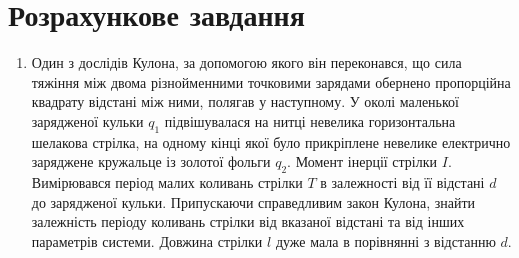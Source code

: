 \section*{Розрахункове завдання}

\begin{enumerate}
\item Один з дослідів Кулона, за допомогою якого він переконався, що сила тяжіння між двома різнойменними
точковими зарядами обернено пропорційна квадрату відстані між ними, полягав у наступному. У околі маленької зарядженої кульки $q_1$ підвішувалася на нитці невелика горизонтальна шелакова стрілка, на одному кінці якої було прикріплене невелике електрично заряджене кружальце із золотої фольги $q_2$. Момент інерції стрілки $I$. Вимірювався період малих коливань стрілки $T$ в залежності від її відстані $d$ до зарядженої кульки. Припускаючи справедливим закон Кулона, знайти залежність періоду коливань стрілки від вказаної відстані та від інших параметрів системи. Довжина стрілки $l$ дуже мала в порівнянні з відстанню $d$.
\end{enumerate}


